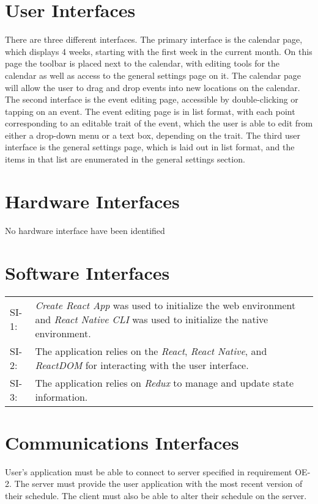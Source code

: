 \documentclass{scrreprt}
\begin{document}
\section{User Interfaces}
There are three different interfaces. The primary interface is the calendar page, which displays 4 weeks, starting with the first week in the current month. On this page the toolbar is placed next to the calendar, with editing tools for the calendar as well as access to the general settings page on it. The calendar page will allow the user to drag and drop events into new locations on the calendar. The second interface is the event editing page, accessible by double-clicking or tapping on an event. The event editing page is in list format, with each point corresponding to an editable trait of the event, which the user is able to edit from either a drop-down menu or a text box, depending on the trait. The third user interface is the general settings page, which is laid out in list format, and the items in that list are enumerated in the general settings section.



\section{Hardware Interfaces}
No hardware interface have been identified

\section{Software Interfaces}
\begin{center}
\begin{tabular}{  p{1cm}  p{13cm}  }
SI-1: & \textit{Create React App} was used to initialize the web environment and \textit{React Native CLI} was used to initialize the native environment.\\
SI-2: & The application relies on the \textit{React}, \textit{React Native}, and \textit{ReactDOM} for interacting with the user interface.\\
SI-3: & The application relies on \textit{Redux} to manage and update state information.
\end{tabular}
\end{center}

\section{Communications Interfaces}
User's application must be able to connect to server specified in requirement OE-2.
The server must provide the user application with the most recent version of their
schedule. The client must also be able to alter their schedule on the server.
\end{document}
